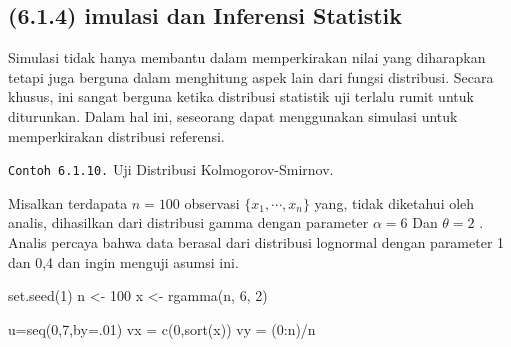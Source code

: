 \documentclass[
]{book}
\newenvironment{Shaded}{\begin{snugshade}}{\end{snugshade}}
\newcommand{\AttributeTok}[1]{\textcolor[rgb]{0.77,0.63,0.00}{#1}}
\newcommand{\DecValTok}[1]{\textcolor[rgb]{0.00,0.00,0.81}{#1}}
\newcommand{\FunctionTok}[1]{\textcolor[rgb]{0.00,0.00,0.00}{#1}}
\newcommand{\NormalTok}[1]{#1}
\newcommand{\OtherTok}[1]{\textcolor[rgb]{0.56,0.35,0.01}{#1}}
\newcommand{\SpecialCharTok}[1]{\textcolor[rgb]{0.00,0.00,0.00}{#1}}
\begin{document}
\hypertarget{imulasi-dan-inferensi-statistik}{%
\subsection{(6.1.4) imulasi dan Inferensi Statistik}\label{imulasi-dan-inferensi-statistik}}

Simulasi tidak hanya membantu dalam memperkirakan nilai yang diharapkan tetapi juga berguna dalam menghitung aspek lain dari fungsi distribusi. Secara khusus, ini sangat berguna ketika distribusi statistik uji terlalu rumit untuk diturunkan. Dalam hal ini, seseorang dapat menggunakan simulasi untuk memperkirakan distribusi referensi.

\texttt{Contoh\ 6.1.10.} Uji Distribusi Kolmogorov-Smirnov.

Misalkan terdapata \(n = 100\) observasi \(\{x_1,\cdots,x_n\}\) yang, tidak diketahui oleh analis, dihasilkan dari distribusi gamma dengan parameter \(\alpha = 6\) Dan \(\theta=2\) . Analis percaya bahwa data berasal dari distribusi lognormal dengan parameter 1 dan 0,4 dan ingin menguji asumsi ini.

\begin{Shaded}
\begin{Highlighting}[]
\FunctionTok{set.seed}\NormalTok{(}\DecValTok{1}\NormalTok{)}
\NormalTok{n }\OtherTok{\textless{}{-}} \DecValTok{100}
\NormalTok{x }\OtherTok{\textless{}{-}} \FunctionTok{rgamma}\NormalTok{(n, }\DecValTok{6}\NormalTok{, }\DecValTok{2}\NormalTok{)}

\NormalTok{u}\OtherTok{=}\FunctionTok{seq}\NormalTok{(}\DecValTok{0}\NormalTok{,}\DecValTok{7}\NormalTok{,}\AttributeTok{by=}\NormalTok{.}\DecValTok{01}\NormalTok{)}
\NormalTok{vx }\OtherTok{=} \FunctionTok{c}\NormalTok{(}\DecValTok{0}\NormalTok{,}\FunctionTok{sort}\NormalTok{(x))}
\NormalTok{vy }\OtherTok{=}\NormalTok{ (}\DecValTok{0}\SpecialCharTok{:}\NormalTok{n)}\SpecialCharTok{/}\NormalTok{n}
\end{Highlighting}
\end{Shaded}
\end{document}

